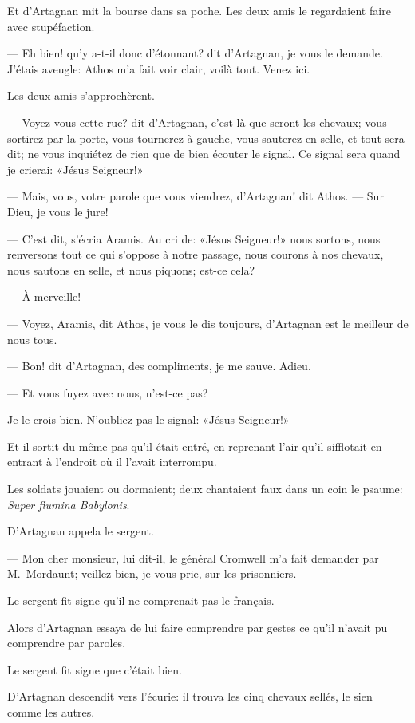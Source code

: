 Et d'Artagnan mit la bourse dans sa poche. Les deux amis le regardaient faire avec stupéfaction.

— Eh bien! qu'y a-t-il donc d'étonnant? dit d'Artagnan, je vous le demande. J'étais aveugle: Athos m'a fait voir clair, voilà tout. Venez ici.

Les deux amis s'approchèrent.

— Voyez-vous cette rue? dit d'Artagnan, c'est là que seront les chevaux; vous sortirez par la porte, vous tournerez à gauche, vous sauterez en selle, et tout sera dit; ne vous inquiétez de rien que de bien écouter le signal. Ce signal sera quand je crierai: «Jésus Seigneur!»

— Mais, vous, votre parole que vous viendrez, d'Artagnan! dit Athos.
— Sur Dieu, je vous le jure!

— C'est dit, s'écria Aramis. Au cri de: «Jésus Seigneur!» nous sortons, nous renversons tout ce qui s'oppose à notre passage, nous courons à nos chevaux, nous sautons en selle, et nous piquons; est-ce cela?

— À merveille!

— Voyez, Aramis, dit Athos, je vous le dis toujours, d'Artagnan est le meilleur de nous tous.

— Bon! dit d'Artagnan, des compliments, je me sauve. Adieu.

— Et vous fuyez avec nous, n'est-ce pas?

Je le crois bien. N'oubliez pas le signal: «Jésus Seigneur!»

Et il sortit du même pas qu'il était entré, en reprenant l'air qu'il sifflotait en entrant à l'endroit où il l'avait interrompu.

Les soldats jouaient ou dormaient; deux chantaient faux dans un coin le psaume: \textit{Super flumina Babylonis}.

D'Artagnan appela le sergent.

— Mon cher monsieur, lui dit-il, le général Cromwell m'a fait demander par M.~Mordaunt; veillez bien, je vous prie, sur les prisonniers.

Le sergent fit signe qu'il ne comprenait pas le français.

Alors d'Artagnan essaya de lui faire comprendre par gestes ce qu'il n'avait pu comprendre par paroles.

Le sergent fit signe que c'était bien.

D'Artagnan descendit vers l'écurie: il trouva les cinq chevaux sellés, le sien comme les autres.

